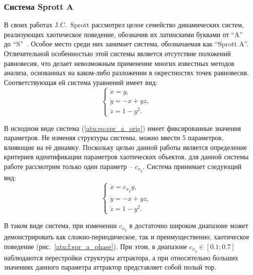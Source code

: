 
\FloatBarrier
\subsubsection{Система Sprott A}


В своих работах J.C.~Sprott рассмотрел целое семейство динамических
систем, реализующих хаотическое поведение, обозначив их латинскими буквами
от ``A'' до ``S''~\cite{sprott_212}. Особое место среди них
занимает система, обозначаемая как ``Sprott A''. Отличительной особенностью
этой системы является отсутствие положений равновесия, что делает
невозможным применение многих известных методов анализа, основанных на
каком-либо разложении в окрестностях точек равновесия. Соответствующая ей
система уравнений имеет вид:
%
\begin{equation}
  \begin{cases}
    \dot{x} =  y, \\
    \dot{y} = -x + yz, \\
    \dot{z} =  1 - y^2.
  \end{cases}
  \label{atu:eq:spr_a_orig}
\end{equation}


В исходном виде система (\ref{atu:eq:spr_a_orig}) имеет фиксированные значения параметров.
Не изменяя структуры системы, можно ввести 5 параметров, влияющие на её динамку.
Поскольку целью данной работы является определение критериев идентификации параметров
хаотических объектов, для данной системы
работе рассмотрим только один параметр -- $c_{x_y} $. Система принимает следующий вид:
%
\begin{equation}
  \begin{cases}
    \dot{x} =  c_{x_y} y, \\
    \dot{y} = -x + yz, \\
    \dot{z} =  1 - y^2.
  \end{cases}
  \label{atu:eq:spr_a}
\end{equation}

В таком виде система, при изменении $c_{x_y} $
в достаточно широком диапазоне может демонстрировать как
сложно-периодическое, так и преимущественно, хаотическое
поведение (рис.~\ref{atu:f:spr_a_phase}). При этом, в диапазоне $c_{x_y} \in [0.1 ; 0.7] $
наблюдаются перестройки структуры аттрактора, а при относительно больших
значениях данного параметра аттрактор представляет собой полый тор.


